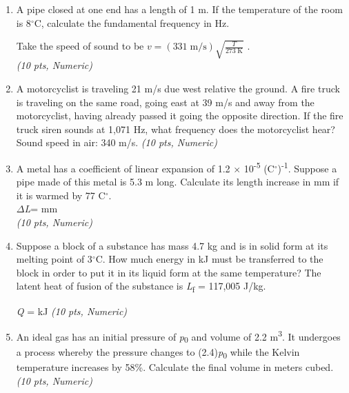 \documentclass[11pt]{article}
\begin{document}
\begin{enumerate}[leftmargin=*]
\textbf{(f)} period [DROPDOWN: 0.942/m | 20 s | 5 s | 0.628 s | 0.628/m | 0.125/m | 6.67 s | 0.15 /m | 10 s]
;

\textbf{(g)} wavelength [DROPDOWN: 5 m | 6.67 m | 0.942 m | 10 m]

\textbf{(h)} propagation speed [DROPDOWN: 3.14 m/s | 1.50 m/s | 2.35 m/s | 0.667 m/s]
;\textbf{}

\textbf{(i)}transverse \textbf{speed} at \emph{x} = 0, \emph{t} = 0: [DROPDOWN: 2.22 m/s | 10 m/s | 3.14 m/s | 6.67 m/s] \hfill \textit{(10 pts, Dropdown)}

  \item A pipe closed at one end has a length of 1 m. If the temperature of the room is 8$^{\circ}$C, calculate the fundamental frequency in Hz.

Take the speed of sound to be $v=(331\;\mathrm{m/s})\sqrt{\frac{T}{273\;\mathrm{K}}}$ . \\ \hfill \textit{(10 pts, Numeric)}

  \item A motorcyclist is traveling 21 m/s due west relative the ground. A fire truck is traveling on the same road, going east at 39 m/s and away from the motorcyclist, having already passed it going the opposite direction. If the fire truck siren sounds at 1,071 Hz, what frequency does the motorcyclist hear? Sound speed in air: 340 m/s. \hfill \textit{(10 pts, Numeric)}

  \item A metal has a coefficient of linear expansion of 1.2 $\times$ 10\textsuperscript{-5} (C$^{\circ}$)\textsuperscript{-1}. Suppose a pipe made of this metal is 5.3 m long. Calculate its length increase in mm if it is warmed by 77 C$^{\circ}$. \\

$\Delta$\emph{L}= mm \\ \hfill \textit{(10 pts, Numeric)}

  \item Suppose a block of a substance has mass 4.7 kg and is in solid form at its melting point of 3$^{\circ}$C. How much energy in kJ must be transferred to the block in order to put it in its liquid form at the same temperature? The latent heat of fusion of the substance is \emph{L}\textsubscript{f} = 117,005 J/kg.

\emph{Q} = kJ \hfill \textit{(10 pts, Numeric)}

  \item An ideal gas has an initial pressure of \emph{p}\textsubscript{0} and volume of 2.2 m\textsuperscript{3}. It undergoes a process whereby the pressure changes to (2.4)\emph{p}\textsubscript{0} while the Kelvin temperature increases by 58\%. Calculate the final volume in meters cubed. \hfill \textit{(10 pts, Numeric)}


\end{enumerate}
\end{document}
